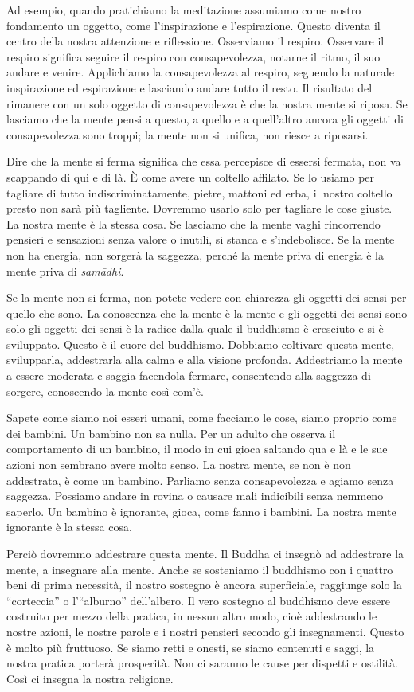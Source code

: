 Ad esempio, quando pratichiamo la meditazione assumiamo come nostro
fondamento un oggetto, come l'inspirazione e l'espirazione. Questo
diventa il centro della nostra attenzione e riflessione. Osserviamo il
respiro. Osservare il respiro significa seguire il respiro con
consapevolezza, notarne il ritmo, il suo andare e venire. Applichiamo la
consapevolezza al respiro, seguendo la naturale inspirazione ed
espirazione e lasciando andare tutto il resto. Il risultato del rimanere
con un solo oggetto di consapevolezza è che la nostra mente si riposa.
Se lasciamo che la mente pensi a questo, a quello e a quell'altro ancora
gli oggetti di consapevolezza sono troppi; la mente non si unifica, non
riesce a riposarsi.

Dire che la mente si ferma significa che essa percepisce di essersi
fermata, non va scappando di qui e di là. È come avere un coltello
affilato. Se lo usiamo per tagliare di tutto indiscriminatamente,
pietre, mattoni ed erba, il nostro coltello presto non sarà più
tagliente. Dovremmo usarlo solo per tagliare le cose giuste. La nostra
mente è la stessa cosa. Se lasciamo che la mente vaghi rincorrendo
pensieri e sensazioni senza valore o inutili, si stanca e s'indebolisce.
Se la mente non ha energia, non sorgerà la saggezza, perché la mente
priva di energia è la mente priva di \emph{samādhi}.

Se la mente non si ferma, non potete vedere con chiarezza gli oggetti
dei sensi per quello che sono. La conoscenza che la mente è la mente e
gli oggetti dei sensi sono solo gli oggetti dei sensi è la radice dalla
quale il buddhismo è cresciuto e si è sviluppato. Questo è il cuore del
buddhismo. Dobbiamo coltivare questa mente, svilupparla, addestrarla
alla calma e alla visione profonda. Addestriamo la mente a essere
moderata e saggia facendola fermare, consentendo alla saggezza di
sorgere, conoscendo la mente così com'è.

Sapete come siamo noi esseri umani, come facciamo le cose, siamo proprio
come dei bambini. Un bambino non sa nulla. Per un adulto che osserva il
comportamento di un bambino, il modo in cui gioca saltando qua e là e le
sue azioni non sembrano avere molto senso. La nostra mente, se non è non
addestrata, è come un bambino. Parliamo senza consapevolezza e agiamo
senza saggezza. Possiamo andare in rovina o causare mali indicibili
senza nemmeno saperlo. Un bambino è ignorante, gioca, come fanno i
bambini. La nostra mente ignorante è la stessa cosa.

Perciò dovremmo addestrare questa mente. Il Buddha ci insegnò ad
addestrare la mente, a insegnare alla mente. Anche se sosteniamo il
buddhismo con i quattro beni di prima necessità, il nostro sostegno è
ancora superficiale, raggiunge solo la ``corteccia'' o l'``alburno''
dell'albero. Il vero sostegno al buddhismo deve essere costruito per
mezzo della pratica, in nessun altro modo, cioè addestrando le nostre
azioni, le nostre parole e i nostri pensieri secondo gli insegnamenti.
Questo è molto più fruttuoso. Se siamo retti e onesti, se siamo
contenuti e saggi, la nostra pratica porterà prosperità. Non ci saranno
le cause per dispetti e ostilità. Così ci insegna la nostra religione.


